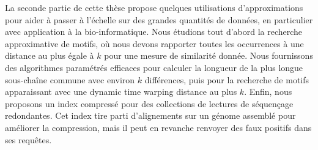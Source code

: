 La seconde partie de cette thèse propose quelques utilisations d'approximations pour aider à passer à l'échelle sur des grandes quantités de données, en particulier avec application à la bio-informatique.
%
Nous étudions tout d'abord la recherche approximative de motifs, où nous devons rapporter toutes les occurrences à une distance au plus égale à $k$ pour une mesure de similarité donnée.
Nous fournissons des algorithmes paramétrés efficaces pour calculer la longueur de la plus longue sous-chaîne commune avec environ $k$ différences, puis pour la recherche de motifs apparaissant avec une dynamic time warping distance au plus $k$.
Enfin, nous proposons un index compressé pour des collections de lectures de séquençage redondantes. Cet index tire parti d'alignements sur un génome assemblé pour améliorer la compression, mais il peut en revanche renvoyer des faux positifs dans ses requêtes.